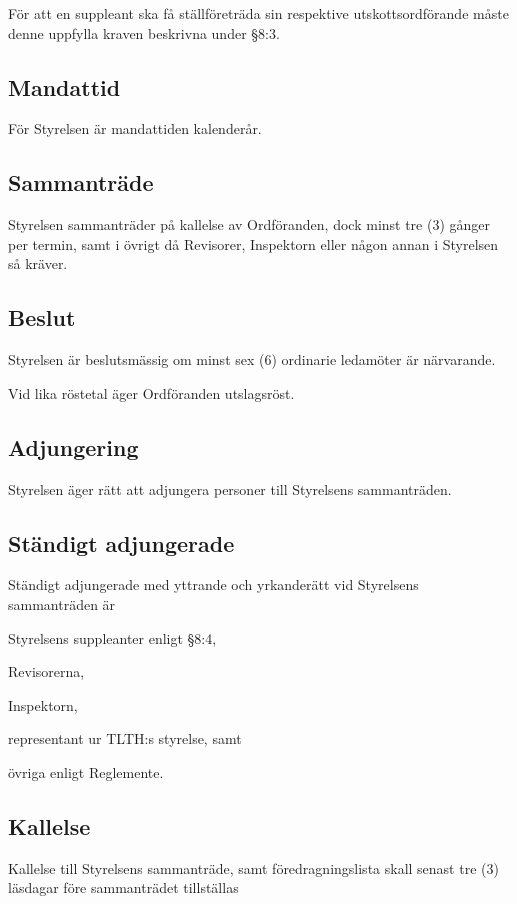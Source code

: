 \documentclass[10pt]{article}
\begin{document}
    För att en suppleant ska få ställföreträda sin respektive utskottsordförande måste denne uppfylla kraven beskrivna under \S8:3.

    \subsection{Mandattid}
    För Styrelsen är mandattiden kalenderår.
    
    \subsection{Sammanträde}
    Styrelsen sammanträder på kallelse av Ordföranden, dock minst tre (3) gånger
    per termin, samt i övrigt då Revisorer, Inspektorn eller någon annan i
    Styrelsen så kräver.
    
    \subsection{Beslut}
    Styrelsen är beslutsmässig om minst sex (6) ordinarie ledamöter är närvarande.

    Vid lika röstetal äger Ordföranden utslagsröst.
    
    \subsection{Adjungering}
    Styrelsen äger rätt att adjungera personer till Styrelsens sammanträden.
    
    \subsection{Ständigt adjungerade}
    Ständigt adjungerade med yttrande och yrkanderätt
    vid Styrelsens sammanträden är
    
    \begin{alphlist}
    \item Styrelsens suppleanter enligt \S8:4,
    \item Revisorerna,
    \item Inspektorn,
    \item representant ur TLTH:s styrelse, samt
    \item övriga enligt Reglemente.
    \end{alphlist}
    
    \subsection{Kallelse}
    Kallelse till Styrelsens sammanträde, samt föredragningslista skall senast
    tre (3) läsdagar före sammanträdet tillställas
    
\end{document}
